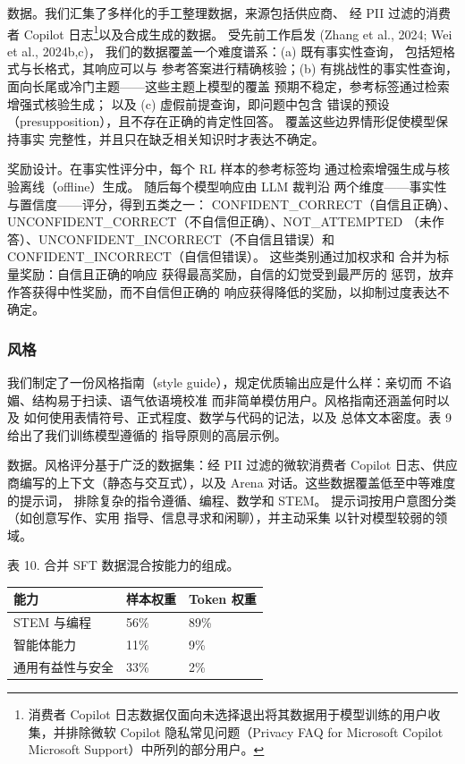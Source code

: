 \documentclass[
  10
]{article}
\newcounter{none} %
\begin{document}
数据。我们汇集了多样化的手工整理数据，来源包括供应商、
经 PII 过滤的消费者 Copilot 日志\footnote{消费者 Copilot 日志数据仅面向未选择退出将其数据用于模型训练的用户收集，并排除微软 Copilot 隐私常见问题（Privacy FAQ for Microsoft Copilot \textbar{} Microsoft Support）中所列的部分用户。}以及合成生成的数据。
受先前工作启发 (Zhang et al., 2024; Wei et al., 2024b,c)，
我们的数据覆盖一个难度谱系：(a) 既有事实性查询，
包括短格式与长格式，其响应可以与
参考答案进行精确核验；(b) 有挑战性的事实性查询，
面向长尾或冷门主题——这些主题上模型的覆盖
预期不稳定，参考标签通过检索增强式核验生成；
以及 (c) 虚假前提查询，即问题中包含
错误的预设（presupposition），且不存在正确的肯定性回答。
覆盖这些边界情形促使模型保持事实
完整性，并且只在缺乏相关知识时才表达不确定。

奖励设计。在事实性评分中，每个 RL 样本的参考标签均
通过检索增强生成与核验离线（offline）生成。
随后每个模型响应由 LLM 裁判沿
两个维度——事实性与置信度——评分，得到五类之一：
CONFIDENT\_CORRECT（自信且正确）、UNCONFIDENT\_CORRECT（不自信但正确）、NOT\_ATTEMPTED
（未作答）、UNCONFIDENT\_INCORRECT（不自信且错误）和 CONFIDENT\_INCORRECT（自信但错误）。
这些类别通过加权求和
合并为标量奖励：自信且正确的响应
获得最高奖励，自信的幻觉受到最严厉的
惩罚，放弃作答获得中性奖励，而不自信但正确的
响应获得降低的奖励，以抑制过度表达不确定。

\subsubsection{风格}\label{style}

我们制定了一份风格指南（style guide），规定优质输出应是什么样：亲切而
不谄媚、结构易于扫读、语气依语境校准
而非简单模仿用户。风格指南还涵盖何时以及
如何使用表情符号、正式程度、数学与代码的记法，以及
总体文本密度。表 9 给出了我们训练模型遵循的
指导原则的高层示例。

数据。风格评分基于广泛的数据集：经 PII 过滤的微软消费者
Copilot 日志、供应商编写的上下文（静态与交互式），以及
Arena 对话。这些数据覆盖低至中等难度的提示词，
排除复杂的指令遵循、编程、数学和 STEM。
提示词按用户意图分类（如创意写作、实用
指导、信息寻求和闲聊），并主动采集
以针对模型较弱的领域。



表 10. 合并 SFT 数据混合按能力的组成。

{\def\LTcaptype{none} %
\begin{longtable}[]{@{}|l|l|l|@{}}
\toprule\noalign{}
\endhead
\bottomrule\noalign{}
\endlastfoot
\hline
能力 & 样本权重 & Token 权重 \\
\hline
STEM 与编程 & 56\% & 89\% \\
\hline
智能体能力 & 11\% & 9\% \\
\hline
通用有益性与安全 & 33\% & 2\% \\
\hline
\end{longtable}
}
\end{document}
